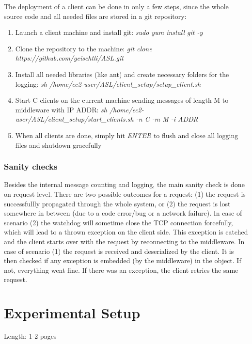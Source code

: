 \documentclass[11pt]{article}
\begin{document}
The deployment of a client can be done in only a few steps, since the whole source code and all needed files are stored in a git repository:
\begin{enumerate}
	\item Launch a client machine and install git: \textit{sudo yum install git -y}
	\item Clone the repository to the machine: \textit{git clone https://github.com/geischtli/ASL.git}
	\item Install all needed libraries (like ant) and create necessary folders for the logging: \newline \textit{sh /home/ec2-user/ASL/client\_setup/setup\_client.sh}
	\item Start C clients on the current machine sending messages of length M to middleware with IP ADDR: \newline\textit{sh /home/ec2-user/ASL/client\_setup/start\_clients.sh -n C -m M -i ADDR}
	\item When all clients are done, simply hit \textit{ENTER} to flush and close all logging files and shutdown gracefully
\end{enumerate}

\subsubsection{Sanity checks}\label{sec:sanity-checks}
Besides the internal message counting and logging, the main sanity check is done on request level. There are two possible outcomes for a request: (1) the request is successfullly propagated through the whole system, or (2) the request is lost somewhere in between (due to a code error/bug or a network failure). In case of scenario (2) the watchdog will sometime close the TCP connection forcefully, which will lead to a thrown exception on the client side. This exception is catched and the client starts over with the request by reconnecting to the middleware. In case of scenario (1) the request is received  and deserialized by the client. It is then checked if any exception is embedded (by the middleware) in the object. If not, everything went fine. If there was an exception, the client retries the same request.

\section{Experimental Setup}\label{sec:experimental-setup}

Length: 1-2 pages
\end{document}
